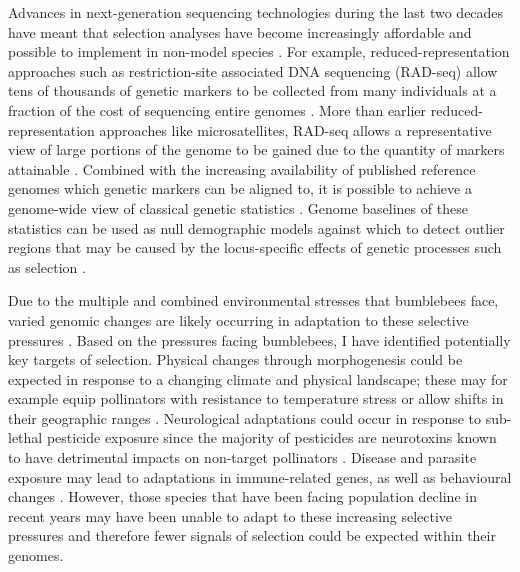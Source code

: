 \documentclass[12pt]{article}
\begin{document}
\begin{linenumbers}
	Advances in next-generation sequencing technologies during the last two decades have meant that selection analyses have become increasingly affordable and possible to implement in non-model species \citep{van_dijk_ten_2014, hu_next-generation_2021}. 
	For example, reduced-representation approaches such as restriction-site associated DNA sequencing (RAD-seq) allow tens of thousands of genetic markers to be collected from many individuals at a fraction of the cost of sequencing entire genomes \citep{miller_rapid_2007, baird_rapid_2008, andrews_harnessing_2016}. 
	More than earlier reduced-representation approaches like microsatellites, RAD-seq allows a representative view of large portions of the genome to be gained due to the quantity of markers attainable \citep{davey_radseq_2010, lozier_revisiting_2014, catchen_unbroken_2017, sunde_comparing_2020}. 
	Combined with the increasing availability of published reference genomes which genetic markers can be aligned to, it is possible to achieve a genome-wide view of classical genetic statistics \citep{manel_genomic_2016}. Genome baselines of these statistics can be used as null demographic models against which to detect outlier regions that may be caused by the locus-specific effects of genetic processes such as selection \citep{hohenlohe_using_2010, hohenlohe_population_2012, chavez-galarza_signatures_2013, sunde_comparing_2020}.
	
	
	Due to the multiple and combined environmental stresses that bumblebees face, varied genomic changes are likely occurring in adaptation to these selective pressures \citep{potts_global_2010, colgan_genomic_2022}. 
	Based on the pressures facing bumblebees, I have identified potentially key targets of selection.
	Physical changes through morphogenesis could be expected in response to a changing climate and physical landscape;
	these may for example equip pollinators with resistance to temperature stress or allow shifts in their geographic ranges \citep{jackson_local_2020, maebe_bumblebee_2021}. 
	Neurological adaptations could occur in response to sub-lethal pesticide exposure since the majority of pesticides are neurotoxins known to have detrimental impacts on non-target pollinators
	\citep{siviter_quantifying_2018, bebane_effects_2019, colgan_caste-_2019, roat_using_2020}. 
	Disease and parasite exposure may lead to adaptations in immune-related genes, as well as behavioural changes 
	\citep{fouks_recognition_2011, ellis_patterns_2012}. 
	However, those species that have been facing population decline in recent years may have been unable to adapt to these increasing selective pressures and therefore fewer signals of selection could be expected within their genomes. 
	

\end{linenumbers}
\end{document}
